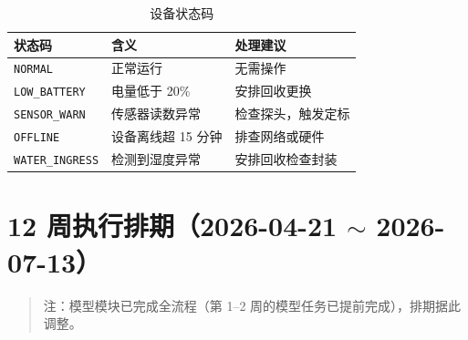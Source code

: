 \documentclass[12pt,a4paper,openany]{ctexrep}
\begin{document}
\begin{table}[htbp]
\centering
\caption{设备状态码}
\begin{tabular}{lll}
\toprule
\textbf{状态码} & \textbf{含义} & \textbf{处理建议} \\
\midrule
\texttt{NORMAL} & 正常运行 & 无需操作 \\
\texttt{LOW\_BATTERY} & 电量低于 20\% & 安排回收更换 \\
\texttt{SENSOR\_WARN} & 传感器读数异常 & 检查探头，触发定标 \\
\texttt{OFFLINE} & 设备离线超 15 分钟 & 排查网络或硬件 \\
\texttt{WATER\_INGRESS} & 检测到湿度异常 & 安排回收检查封装 \\
\bottomrule
\end{tabular}
\end{table}

\chapter{12 周执行排期（2026-04-21 $\sim$ 2026-07-13）}

\begin{quote}
注：模型模块已完成全流程（第 1--2 周的模型任务已提前完成），排期据此调整。
\end{quote}
\end{document}
